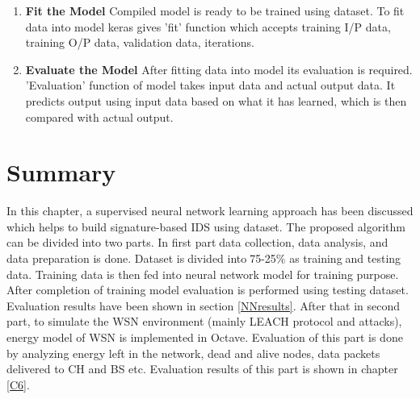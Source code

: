 \begin{enumerate}[label=\textbf{\roman*}.]
\item \textbf{Fit the Model } Compiled model is ready to be trained using dataset. To fit data into model keras gives 'fit' function which accepts training I/P data, training O/P data, validation data, iterations.

\item \textbf{Evaluate the Model } After fitting data into model its evaluation is required. 'Evaluation' function of model takes input data and actual output data. It predicts output using input data based on what it has learned, which is then compared with actual output. 

\end{enumerate}    

        
\section{Summary} \label{SSummary}
In this chapter, a supervised neural network learning approach has been discussed which helps to build signature-based IDS using dataset. The proposed algorithm can be divided\textcolor{white}{.}into two\textcolor{white}{.}parts. In first part\textcolor{white}{.}data collection, data analysis, and data preparation is done. Dataset is\textcolor{white}{.}divided into\textcolor{white}{.}75-25\% as training\textcolor{white}{.}and testing data.  Training data is then fed into neural network model for training purpose. After completion of training model evaluation is performed using testing dataset. Evaluation results have been shown in section \ref{NNresults}.
After that in second part, to simulate the WSN environment (mainly LEACH protocol and attacks), energy model of WSN is implemented in Octave. Evaluation of this part is done by analyzing energy left in the network, dead and alive nodes, data packets delivered to CH and BS etc. Evaluation results of this part is shown in chapter \ref{C6}.
 
